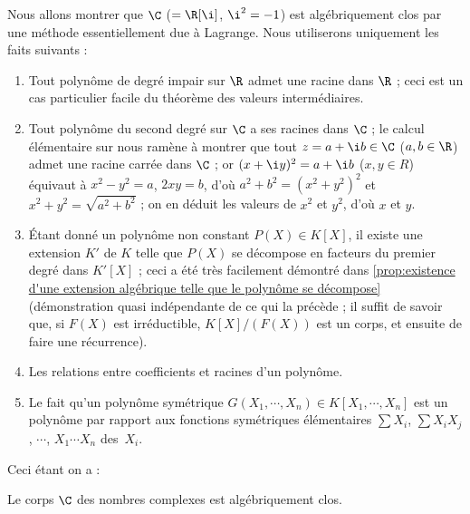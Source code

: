 \documentclass[11pt, useosf,
  title in boldface,
  theorem in new line,
  theorem numbering = section,
  number theorems separately,
]{simplivre}
\begin{document}
    Nous allons montrer que \( \C \) (\( = \R[\i] \), \( \i^2 = -1 \)) est algébriquement clos par une méthode essentiellement due à Lagrange. Nous utiliserons uniquement les faits suivants :
    \begin{enumerate}
        \item \label{faits utilisés pour montrer C est algébriquement clos;fait1} Tout polynôme de degré impair sur \( \R \) admet une racine dans \( \R \) ; ceci est un cas particulier facile du théorème des valeurs intermédiaires.
        \item \label{faits utilisés pour montrer C est algébriquement clos;fait2} Tout polynôme du second degré sur \( \C \) a ses racines dans \( \C \) ; le calcul élémentaire sur  nous ramène à montrer que tout \( z = a + \i b \in \C \) (\( a,b \in \R \)) admet une racine carrée dans \( \C \) ; or \( (x + \i y)^2 = a + \i b \) (\( x,y \in R \)) équivaut à \( x^2-y^2 = a \), \( 2xy = b \), d'où \( a^2 + b^2 = (x^2+y^2)^2 \) et \( x^2+y^2 = \sqrt{a^2 + b^2} \) ; on en déduit les valeurs de \( x^2 \) et \( y^2 \), d'où \( x \) et \( y \).
        \item \label{faits utilisés pour montrer C est algébriquement clos;fait3} Étant donné un polynôme non constant \( P(X) \in K[X] \), il existe une extension \( K' \) de \( K \) telle que \( P(X) \) se décompose en facteurs du premier degré dans \( K'[X] \) ; ceci a été très facilement démontré dans \cref{prop:existence d'une extension algébrique telle que le polynôme se décompose} (démonstration quasi indépendante de ce qui la précède ; il suffit de savoir que, si \( F(X) \) est irréductible, \( K[X]/(F(X)) \) est un corps, et ensuite de faire une récurrence).
        \item \label{faits utilisés pour montrer C est algébriquement clos;fait4} Les relations entre coefficients et racines d'un polynôme.
        \item \label{faits utilisés pour montrer C est algébriquement clos;fait5} Le fait qu'un polynôme symétrique \( G(X_1, \cdots, X_n) \in K[X_1, \cdots, X_n] \) est un polynôme par rapport aux fonctions symétriques élémentaires \( \sum X_i \), \( \sum X_i X_j \), \( \cdots \), \( X_1 \cdots X_n \) des~\( X_i \).
    \end{enumerate}
    Ceci étant on a :
    \begin{theorem*}
        Le corps \( \C \) des nombres complexes est algébriquement clos.
    \end{theorem*}
\end{document}
